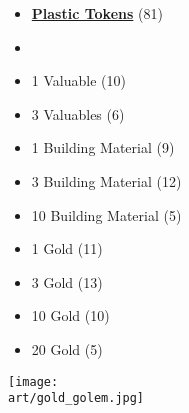 \begin{multicols*}{2}
\begin{itemize}[leftmargin=0pt, label={}, noitemsep, noitemsep]
  \item \textbf{\small{\underline{Plastic Tokens}}} (81)
  \item
  \item 1 Valuable (10)
  \item 3 Valuables (6)
  \item 1 Building Material (9)
  \item 3 Building Material (12)
  \item 10 Building Material (5)
  \item 1 Gold (11)
  \item 3 Gold (13)
  \item 10 Gold (10)
  \item 20 Gold (5)
\end{itemize}

\columnbreak

\hspace{-2.75em}
\texttt{[image: \\art/gold\_golem.jpg]}

\end{multicols*}
